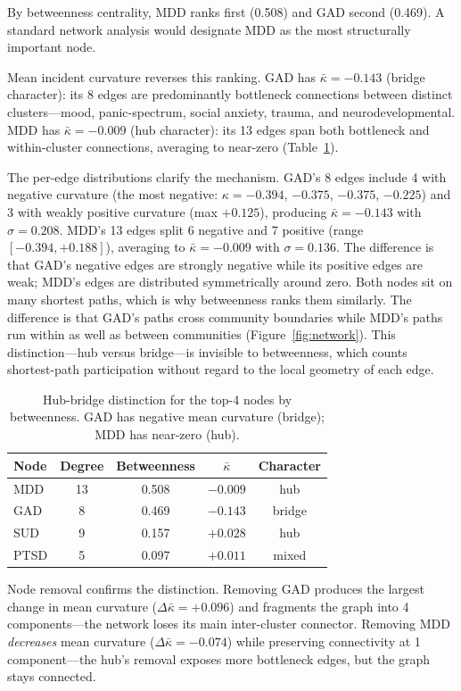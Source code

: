 \documentclass{article}
\begin{document}
By betweenness centrality, MDD ranks first (0.508) and GAD second (0.469). A standard network analysis would designate MDD as the most structurally important node.

Mean incident curvature reverses this ranking. GAD has $\bar\kappa = -0.143$ (bridge character): its 8 edges are predominantly bottleneck connections between distinct clusters---mood, panic-spectrum, social anxiety, trauma, and neurodevelopmental. MDD has $\bar\kappa = -0.009$ (hub character): its 13 edges span both bottleneck and within-cluster connections, averaging to near-zero (Table~\ref{tab:hubbridge}).

The per-edge distributions clarify the mechanism. GAD's 8 edges include 4 with negative curvature (the most negative: $\kappa = -0.394$, $-0.375$, $-0.375$, $-0.225$) and 3 with weakly positive curvature (max $+0.125$), producing $\bar\kappa = -0.143$ with $\sigma = 0.208$. MDD's 13 edges split 6 negative and 7 positive (range $[-0.394, +0.188]$), averaging to $\bar\kappa = -0.009$ with $\sigma = 0.136$. The difference is that GAD's negative edges are strongly negative while its positive edges are weak; MDD's edges are distributed symmetrically around zero. Both nodes sit on many shortest paths, which is why betweenness ranks them similarly. The difference is that GAD's paths cross community boundaries while MDD's paths run within as well as between communities (Figure~\ref{fig:network}). This distinction---hub versus bridge---is invisible to betweenness, which counts shortest-path participation without regard to the local geometry of each edge.

\begin{table}[t]
\centering
\caption{Hub-bridge distinction for the top-4 nodes by betweenness. GAD has negative mean curvature (bridge); MDD has near-zero (hub).}
\label{tab:hubbridge}
\begin{tabular}{lcccc}
\toprule
Node & Degree & Betweenness & $\bar\kappa$ & Character \\
\midrule
MDD  & 13 & 0.508 & $-0.009$ & hub \\
GAD  &  8 & 0.469 & $-0.143$ & bridge \\
SUD  &  9 & 0.157 & $+0.028$ & hub \\
PTSD &  5 & 0.097 & $+0.011$ & mixed \\
\bottomrule
\end{tabular}
\end{table}

Node removal confirms the distinction. Removing GAD produces the largest change in mean curvature ($\Delta\bar\kappa = +0.096$) and fragments the graph into 4 components---the network loses its main inter-cluster connector. Removing MDD \emph{decreases} mean curvature ($\Delta\bar\kappa = -0.074$) while preserving connectivity at 1 component---the hub's removal exposes more bottleneck edges, but the graph stays connected.
\end{document}
